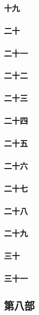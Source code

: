 \subsubsection*{十九}
\subsubsection*{二十}
\subsubsection*{二十一}
\subsubsection*{二十二}
\subsubsection*{二十三}
\subsubsection*{二十四}
\subsubsection*{二十五}
\subsubsection*{二十六}
\subsubsection*{二十七}
\subsubsection*{二十八}
\subsubsection*{二十九}
\subsubsection*{三十}
\subsubsection*{三十一}







\subsection*{第八部}





